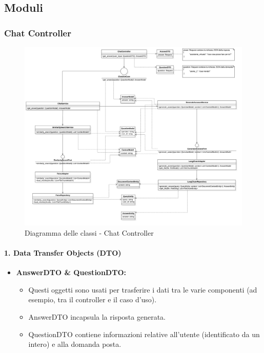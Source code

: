 \subsection{Moduli}

    \subsubsection{Chat Controller}

    \begin{figure}[H]
        \centering
        \includegraphics[width=\linewidth, height=0.8\textheight, keepaspectratio]{./img/ChatController.png}
        \caption{Diagramma delle classi - Chat Controller}
        \label{fig:chat_controller}
    \end{figure}

    \paragraph{1. Data Transfer Objects (DTO)}
    \begin{itemize}
        \item \textbf{AnswerDTO \& QuestionDTO:}
        \begin{itemize}
            \item Questi oggetti sono usati per trasferire i dati tra le varie componenti (ad esempio, tra il controller e il caso d’uso).
            \item AnswerDTO incapsula la risposta generata.
            \item QuestionDTO contiene informazioni relative all’utente (identificato da un intero) e alla domanda posta.
        \end{itemize}
    \end{itemize}

